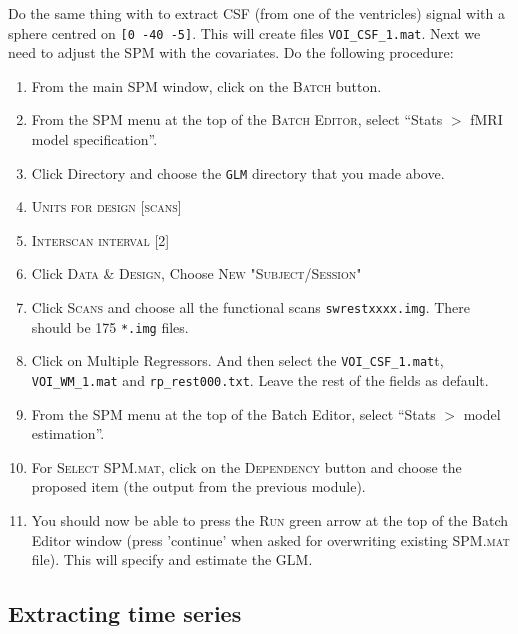 Do the same thing with to extract CSF (from one of the ventricles) signal with a sphere centred on \texttt{[0 -40 -5]}. This will create files \texttt{VOI\_CSF\_1.mat}. Next we need to adjust the SPM with the covariates. Do the following procedure:
\begin{enumerate}
 \item From the main SPM window, click on the \textsc{Batch} button.
 \item From the SPM menu at the top of the \textsc{Batch Editor}, select ``Stats $>$ fMRI model specification''.
 \item Click Directory and choose the \texttt{GLM} directory that you made above.
 \item \textsc{Units for design} [\textsc{scans}]
 \item \textsc{Interscan interval} [2]
 \item Click \textsc{Data \& Design}, Choose \textsc{New "Subject/Session"}
  \item Click \textsc{Scans} and choose all the functional scans \texttt{swrestxxxx.img}. There should be 175 \texttt{*.img} files.
 \item Click on Multiple Regressors. And then select the  \texttt{VOI\_CSF\_1.mat}t, \texttt{VOI\_WM\_1.mat} and \texttt{rp\_rest000.txt}. Leave the rest of the fields as default. 
 \item From the SPM menu at the top of the Batch Editor, select ``Stats $>$ model estimation''.
 \item For \textsc{Select SPM.mat}, click on the \textsc{Dependency} button and choose the proposed item (the output from the previous module).
 \item You should now be able to press the \textsc{Run} green arrow at the top of the Batch Editor window (press 'continue' when asked for overwriting existing \textsc{SPM.mat} file). This will specify and estimate the GLM.
\end{enumerate}

\subsection{Extracting time series}

